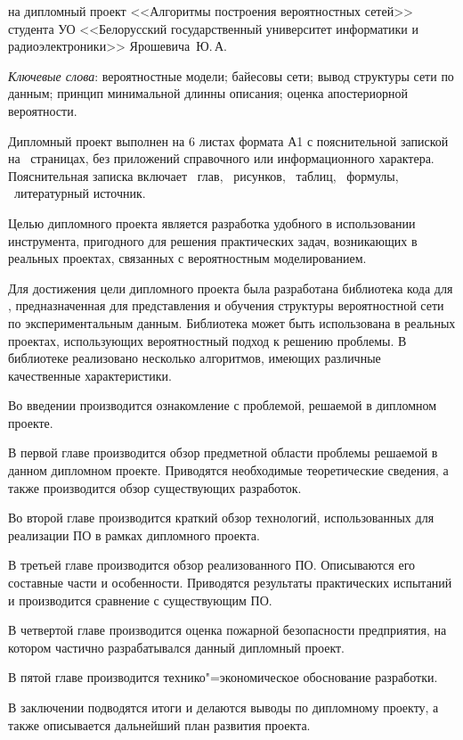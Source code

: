 \thispagestyle{empty}

\begin{center}
  \begin{minipage}{0.82\textwidth}
    на дипломный проект <<Алгоритмы построения вероятностных сетей>> студента УО <<Белорусский государственный университет информатики и радиоэлектроники>> Ярошевича~Ю.\,А.
  \end{minipage}
\end{center}

\emph{Ключевые слова}: вероятностные модели; байесовы сети; вывод структуры сети по данным; принцип минимальной длинны описания; оценка апостериорной вероятности.

\vspace{4\parsep}

Дипломный проект выполнен на 6 листах формата А1 с пояснительной запиской на~\pageref*{LastPage} страницах, без приложений справочного или информационного характера.
Пояснительная записка включает ~глав, \totfig{}~рисунков, \tottab{}~таблиц, \toteq{}~формулы, \totref{}~литературный источник.

Целью дипломного проекта является разработка удобного в использовании инструмента, пригодного для решения практических задач, возникающих в реальных проектах, связанных с вероятностным моделированием.

Для достижения цели дипломного проекта была разработана библиотека кода для , предназначенная для представления и обучения структуры вероятностной сети по экспериментальным данным.
Библиотека может быть использована в реальных проектах, использующих вероятностный подход к решению проблемы.
В библиотеке реализовано несколько алгоритмов, имеющих различные качественные характеристики.

Во введении производится ознакомление с проблемой, решаемой в дипломном проекте.

В первой главе производится обзор предметной области проблемы решаемой в данном дипломном проекте.
Приводятся необходимые теоретические сведения, а также производится обзор существующих разработок.

Во второй главе производится краткий обзор технологий, использованных для реализации ПО в рамках дипломного проекта.

В третьей главе производится обзор реализованного ПО.
Описываются его составные части и особенности.
Приводятся результаты практических испытаний и производится сравнение с существующим ПО.

В четвертой главе производится оценка пожарной безопасности предприятия, на котором частично разрабатывался данный дипломный проект.

В пятой главе производится технико"=экономическое обоснование разработки.

В заключении подводятся итоги и делаются выводы по дипломному проекту, а также описывается дальнейший план развития проекта.

\clearpage
